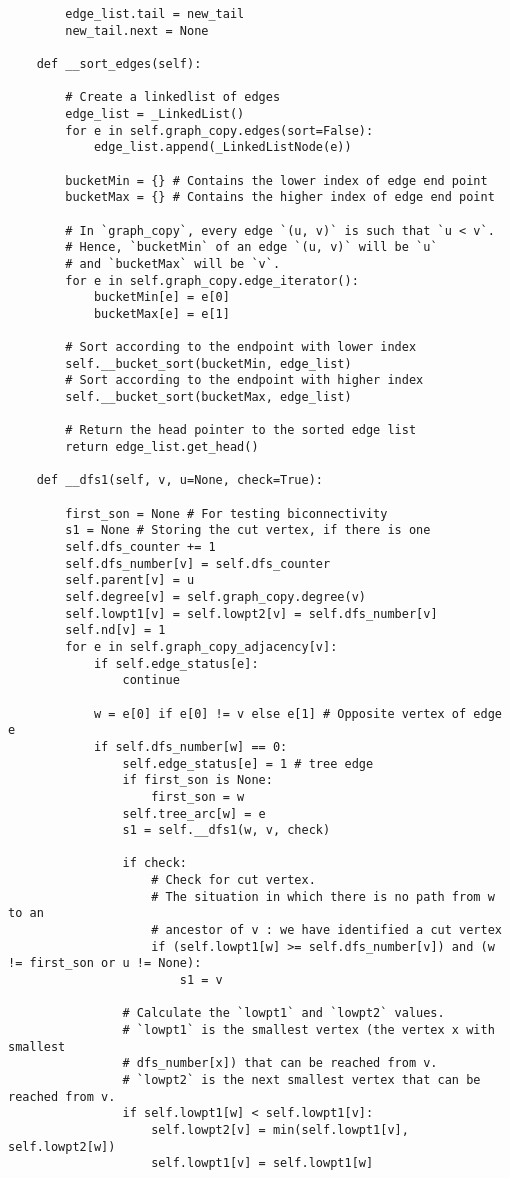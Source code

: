 \begin{center}
\begin{verbatim}
		edge_list.tail = new_tail
		new_tail.next = None

	def __sort_edges(self):

		# Create a linkedlist of edges
		edge_list = _LinkedList()
		for e in self.graph_copy.edges(sort=False):
			edge_list.append(_LinkedListNode(e))

		bucketMin = {} # Contains the lower index of edge end point
		bucketMax = {} # Contains the higher index of edge end point

		# In `graph_copy`, every edge `(u, v)` is such that `u < v`.
		# Hence, `bucketMin` of an edge `(u, v)` will be `u`
		# and `bucketMax` will be `v`.
		for e in self.graph_copy.edge_iterator():
			bucketMin[e] = e[0]
			bucketMax[e] = e[1]

		# Sort according to the endpoint with lower index
		self.__bucket_sort(bucketMin, edge_list)
		# Sort according to the endpoint with higher index
		self.__bucket_sort(bucketMax, edge_list)

		# Return the head pointer to the sorted edge list
		return edge_list.get_head()

	def __dfs1(self, v, u=None, check=True):

		first_son = None # For testing biconnectivity
		s1 = None # Storing the cut vertex, if there is one
		self.dfs_counter += 1
		self.dfs_number[v] = self.dfs_counter
		self.parent[v] = u
		self.degree[v] = self.graph_copy.degree(v)
		self.lowpt1[v] = self.lowpt2[v] = self.dfs_number[v]
		self.nd[v] = 1
		for e in self.graph_copy_adjacency[v]:
			if self.edge_status[e]:
				continue

			w = e[0] if e[0] != v else e[1] # Opposite vertex of edge e
			if self.dfs_number[w] == 0:
				self.edge_status[e] = 1 # tree edge
				if first_son is None:
					first_son = w
				self.tree_arc[w] = e
				s1 = self.__dfs1(w, v, check)

				if check:
					# Check for cut vertex.
					# The situation in which there is no path from w to an
					# ancestor of v : we have identified a cut vertex
					if (self.lowpt1[w] >= self.dfs_number[v]) and (w != first_son or u != None):
						s1 = v

				# Calculate the `lowpt1` and `lowpt2` values.
				# `lowpt1` is the smallest vertex (the vertex x with smallest
				# dfs_number[x]) that can be reached from v.
				# `lowpt2` is the next smallest vertex that can be reached from v.
				if self.lowpt1[w] < self.lowpt1[v]:
					self.lowpt2[v] = min(self.lowpt1[v], self.lowpt2[w])
					self.lowpt1[v] = self.lowpt1[w]


\end{verbatim}
\end{center}
